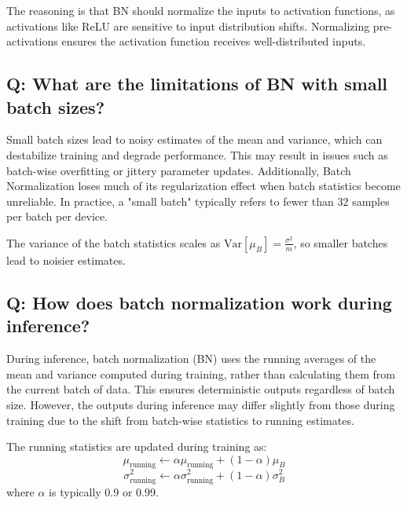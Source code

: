 The reasoning is that BN should normalize the inputs to activation functions, as activations like ReLU are sensitive to input distribution shifts. Normalizing pre-activations ensures the activation function receives well-distributed inputs.

\subsection*{Q: What are the limitations of BN with small batch sizes?}
Small batch sizes lead to noisy estimates of the mean and variance, which can destabilize training and degrade performance. This may result in issues such as batch-wise overfitting or jittery parameter updates. Additionally, Batch Normalization loses much of its regularization effect when batch statistics become unreliable. In practice, a "small batch" typically refers to fewer than 32 samples per batch per device.

The variance of the batch statistics scales as \(\text{Var}[\mu_B] = \frac{\sigma^2}{m}\), so smaller batches lead to noisier estimates.

\subsection*{Q: How does batch normalization work during inference?}
During inference, batch normalization (BN) uses the running averages of the mean and variance computed during training, rather than calculating them from the current batch of data. This ensures deterministic outputs regardless of batch size. However, the outputs during inference may differ slightly from those during training due to the shift from batch-wise statistics to running estimates.

The running statistics are updated during training as:
\[
\mu_{\text{running}} \leftarrow \alpha \mu_{\text{running}} + (1-\alpha) \mu_B
\]
\[
\sigma^2_{\text{running}} \leftarrow \alpha \sigma^2_{\text{running}} + (1-\alpha) \sigma^2_B
\]
where \(\alpha\) is typically 0.9 or 0.99.

